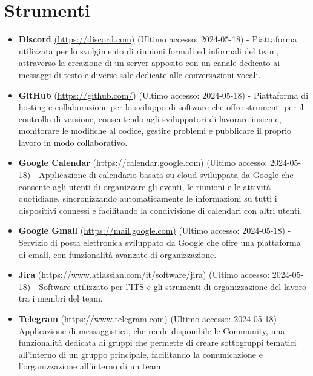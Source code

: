 \section{Strumenti}
\begin{itemize}
    \item \textbf{Discord} \href{https://discord.com}{(https://discord.com)} (Ultimo accesso: 2024-05-18) - Piattaforma utilizzata per lo svolgimento di riunioni formali ed informali del team, attraverso la creazione di un server apposito con un canale dedicato ai messaggi di testo e diverse sale dedicate alle conversazioni vocali.
    
    \item \textbf{GitHub} \href{https://github.com/}{(https://github.com/)} (Ultimo accesso: 2024-05-18) - Piattaforma di hosting e collaborazione per lo sviluppo di software che offre strumenti per il controllo di versione, consentendo agli sviluppatori di lavorare insieme, monitorare le modifiche al codice, gestire problemi e pubblicare il proprio lavoro in modo collaborativo.
    
    \item \textbf{Google Calendar} \href{https://calendar.google.com}{(https://calendar.google.com)} (Ultimo accesso: 2024-05-18) - Applicazione di calendario basata su cloud sviluppata da Google che consente agli utenti di organizzare gli eventi, le riunioni e le attività quotidiane, sincronizzando automaticamente le informazioni su tutti i dispositivi connessi e facilitando la condivisione di calendari con altri utenti.
    
    \item \textbf{Google Gmail} \href{https://mail.google.com}{(https://mail.google.com)} (Ultimo accesso: 2024-05-18) - Servizio di posta elettronica sviluppato da Google che offre una piattaforma di email, con funzionalità avanzate di organizzazione.
    
    \item \textbf{Jira} \href{https://www.atlassian.com/it/software/jira}{(https://www.atlassian.com/it/software/jira)} (Ultimo accesso: 2024-05-18) - Software utilizzato per l'ITS e gli strumenti di organizzazione del lavoro tra i membri del team.
    
    \item \textbf{Telegram} \href{https://www.telegram.com}{(https://www.telegram.com)} (Ultimo accesso: 2024-05-18) - Applicazione di messaggistica, che rende disponibile le Community, una funzionalità dedicata ai gruppi che permette di creare sottogruppi tematici all'interno di un gruppo principale, facilitando la comunicazione e l'organizzazione all'interno di un team.
    

\end{itemize}
